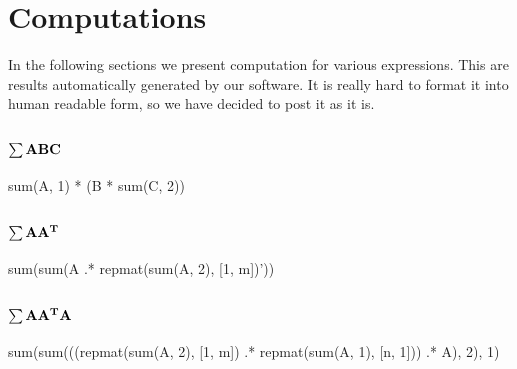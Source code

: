 \documentclass{article}
\begin{document}
 



\section{Computations}

In the following sections we present computation for various expressions.
This are results automatically generated by our software.
It is really hard to format it into human readable form, so we have decided
to post it as it is.

\subsection{{$\bf \sum ABC$}}
sum(A, 1) * (B * sum(C, 2))

\subsection{{$\bf \sum AA^T$}}
sum(sum(A .* repmat(sum(A, 2), [1, m])'))

\subsection{{$\bf \sum AA^TA$}}
sum(sum(((repmat(sum(A, 2), [1, m]) .* repmat(sum(A, 1), [n, 1])) .* A), 2), 1) 
\end{document}
